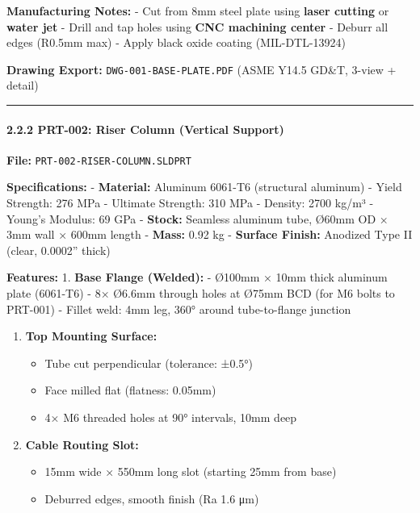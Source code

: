 \documentclass[
]{article}
\providecommand{\tightlist}{%
  \setlength{\itemsep}{0pt}\setlength{\parskip}{0pt}}
\begin{document}
\textbf{Manufacturing Notes:} - Cut from 8mm steel plate using
\textbf{laser cutting} or \textbf{water jet} - Drill and tap holes using
\textbf{CNC machining center} - Deburr all edges (R0.5mm max) - Apply
black oxide coating (MIL-DTL-13924)

\textbf{Drawing Export:} \texttt{DWG-001-BASE-PLATE.PDF} (ASME Y14.5
GD\&T, 3-view + detail)

\begin{center}\rule{0.5\linewidth}{0.5pt}\end{center}

\hypertarget{prt-002-riser-column-vertical-support}{%
\paragraph{2.2.2 PRT-002: Riser Column (Vertical
Support)}\label{prt-002-riser-column-vertical-support}}

\textbf{File:} \texttt{PRT-002-RISER-COLUMN.SLDPRT}

\textbf{Specifications:} - \textbf{Material:} Aluminum 6061-T6
(structural aluminum) - Yield Strength: 276 MPa - Ultimate Strength: 310
MPa - Density: 2700 kg/m³ - Young's Modulus: 69 GPa - \textbf{Stock:}
Seamless aluminum tube, Ø60mm OD × 3mm wall × 600mm length -
\textbf{Mass:} 0.92 kg - \textbf{Surface Finish:} Anodized Type II
(clear, 0.0002'' thick)

\textbf{Features:} 1. \textbf{Base Flange (Welded):} - Ø100mm × 10mm
thick aluminum plate (6061-T6) - 8× Ø6.6mm through holes at Ø75mm BCD
(for M6 bolts to PRT-001) - Fillet weld: 4mm leg, 360° around
tube-to-flange junction

\begin{enumerate}
\def\labelenumi{\arabic{enumi}.}
\setcounter{enumi}{1}
\tightlist
\item
  \textbf{Top Mounting Surface:}

  \begin{itemize}
  \tightlist
  \item
    Tube cut perpendicular (tolerance: ±0.5°)
  \item
    Face milled flat (flatness: 0.05mm)
  \item
    4× M6 threaded holes at 90° intervals, 10mm deep
  \end{itemize}
\item
  \textbf{Cable Routing Slot:}

  \begin{itemize}
  \tightlist
  \item
    15mm wide × 550mm long slot (starting 25mm from base)
  \item
    Deburred edges, smooth finish (Ra 1.6 μm)
  \end{itemize}
\end{enumerate}
\end{document}
